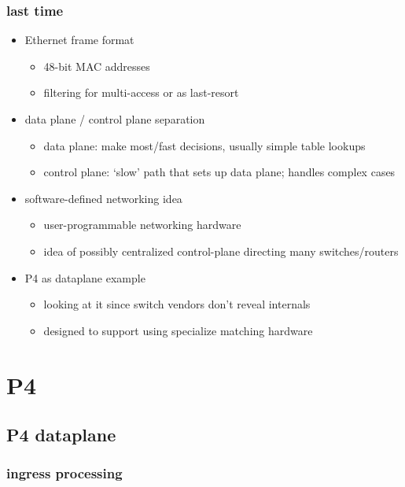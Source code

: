 \date{}
\title{}
\date{}

\begin{frame}
    \titlepage
\end{frame}

\begin{frame}
\frametitle{last time}
\begin{itemize}
\item Ethernet frame format
    \begin{itemize}
    \item 48-bit MAC addresses
    \item filtering for multi-access or as last-resort
    \end{itemize}
\item data plane / control plane separation
    \begin{itemize}
    \item data plane: make most/fast decisions, usually simple table lookups
    \item control plane: `slow' path that sets up data plane; handles complex cases
    \end{itemize}
\item software-defined networking idea
    \begin{itemize}
    \item user-programmable networking hardware
    \item idea of possibly centralized control-plane directing many switches/routers
    \end{itemize}
\item P4 as dataplane example
    \begin{itemize}
    \item looking at it since switch vendors don't reveal internals
    \item designed to support using specialize matching hardware
    \end{itemize}
\end{itemize}
\end{frame}


\section{P4}
\subsection{P4 dataplane}
\subsubsection{ingress processing}

